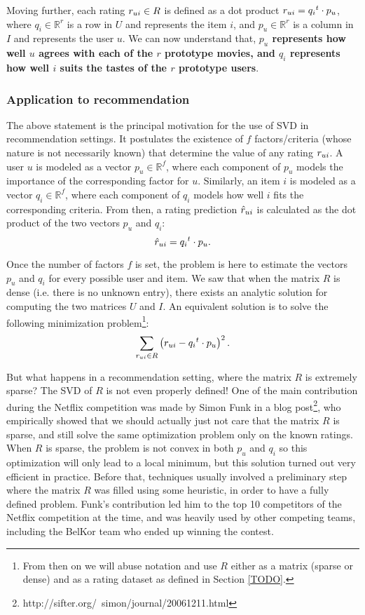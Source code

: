 Moving further, each rating $r_{ui} \in R$ is defined as a dot product $r_{ui} =
{q_i}^t \cdot p_u$, where $q_i \in \mathbb{R}^r$ is a row in $U$ and represents
the item $i$, and $p_u \in \mathbb{R}^r$ is a column in $I$ and represents the
user $u$. We can now understand that, \textbf{$p_u$ represents how well $u$
agrees with each of the $r$ prototype movies, and $q_i$ represents how well $i$
suits the tastes of the $r$ prototype users}.

\subsubsection{Application to recommendation}

The above statement is the principal motivation for the use of SVD in recommendation
settings. It postulates the existence of $f$ factors/criteria (whose nature is
not necessarily known) that determine the value of any rating $r_{ui}$.  A user
$u$ is modeled as a vector $p_u \in \mathbb{R}^f$, where each component of
$p_u$ models the importance of the corresponding factor for $u$.  Similarly, an
item $i$ is modeled as a vector $q_i \in \mathbb{R}^f$, where each component of
$q_i$ models how well $i$ fits the corresponding criteria.  From then, a rating
prediction $\hat{r}_{ui}$ is calculated as the dot product of the two vectors $p_u$
and $q_i$:
$$\hat{r}_{ui} = {q_i}^t \cdot p_u.$$

Once the number of factors $f$ is set, the problem is here to estimate the
vectors $p_u$ and $q_i$ for every possible user and item. We saw that when the
matrix $R$ is dense (i.e. there is no unknown entry), there exists an analytic
solution for computing the two matrices $U$ and $I$. An equivalent solution is
to solve the following minimization problem\footnote{From then on we will abuse
notation and use $R$ either as a matrix (sparse or dense) and as a rating
dataset as defined in Section \ref{TODO}.}:
$$
\sum_{r_{ui} \in R} \left(r_{ui} - {q_i}^t \cdot p_u \right)^2.
$$

But what happens in a recommendation setting, where the matrix $R$ is extremely
sparse? The SVD of $R$ is not even properly defined! One of the main
contribution during the Netflix competition was made by Simon Funk in a blog
post\footnote{http://sifter.org/~simon/journal/20061211.html}, who
empirically showed that we should actually just not care that the matrix $R$ is
sparse, and still solve the same optimization problem only on the known
ratings.  When $R$ is sparse, the problem is not convex in both $p_u$ and $q_i$
so this optimization will only lead to a local minimum,
but this solution turned out very efficient in practice. Before that,
techniques usually involved  a preliminary step where the matrix $R$ was filled
using some heuristic, in order to have a fully defined problem. Funk's
contribution led him to the top 10 competitors of the Netflix competition at
the time, and was heavily used by other competing teams, including the BelKor
team who ended up winning the contest.

